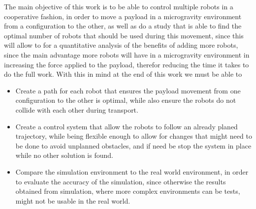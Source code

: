 The main objective of this work is to be able to control multiple robots in a cooperative fashion, in order to move a payload in a microgravity environment from a configuration to the other, as well as do a study that is able to find the optimal number of robots that should be used during this movement, since this will allow to for a quantitative analysis of the benefits of adding more robots, since the main advantage more robots will have in a microgravity environment in increasing the force applied to the payload, therefor reducing the time it takes to do the full work. With this in mind at the end of this work we must be able to

\begin{itemize}
    \item Create a path for each robot that ensures the payload movement from one configuration to the other is optimal, while also ensure the robots do not collide with each other during transport.
    \item Create a control system that allow the robots to follow an already planed trajectory, while being flexible enough to allow for changes that might need to be done to avoid unplanned obstacles, and if need be stop the system in place while no other solution is found. 
    \item Compare the simulation environment to the real world environment, in order to evaluate the accuracy of the simulation, since otherwise the results obtained from simulation, where more complex environments can be tests, might not be usable in the real world.

\end{itemize}